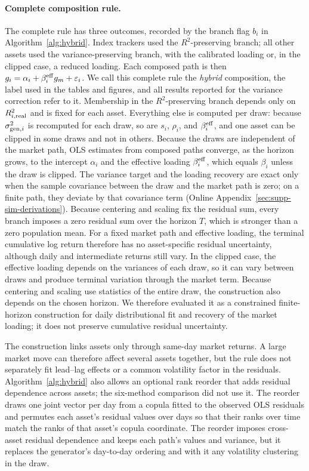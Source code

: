 \paragraph{Complete composition rule.}

The complete rule has three outcomes, recorded by the branch flag
$b_i$ in Algorithm~\ref{alg:hybrid}. Index trackers used the
$R^2$-preserving branch; all other assets used the
variance-preserving branch, with the calibrated loading or, in the
clipped case, a reduced loading. Each composed path is then
$g_i=\alpha_i+\beta_i^{\mathrm{eff}}g_m+\varepsilon_i$. We call this complete rule
the \emph{hybrid} composition, the label used in the tables and
figures, and all results reported for the variance correction refer
to it. Membership in the $R^2$-preserving branch depends only on
$R^2_{i,\mathrm{real}}$ and is fixed for each asset. Everything else is
computed per draw: because $\sigma_{\mathrm{gen},i}^2$ is recomputed for each
draw, so are $s_i$, $\rho_i$, and $\beta_i^{\mathrm{eff}}$, and one asset can be
clipped in some draws and not in others. Because the draws are independent of the market path, OLS estimates
from composed paths converge, as the horizon grows, to the intercept
$\alpha_i$ and the effective loading $\beta_i^{\mathrm{eff}}$, which equals
$\beta_i$ unless the draw is clipped. The variance target and the loading recovery are exact only when the
sample covariance between the draw and the market path is zero; on a
finite path, they deviate by that covariance term (Online
Appendix~\ref{sec:supp-sim-derivations}). Because centering and
scaling fix the residual sum, every branch imposes a zero residual sum over the horizon $T$, which is stronger than a zero population
mean. For a fixed market path and effective loading, the terminal
cumulative log return therefore has no asset-specific residual
uncertainty, although daily and intermediate returns still vary. In
the clipped case, the effective loading depends on the variances of
each draw, so it can vary between draws and produce terminal
variation through the market term. Because centering and scaling use
statistics of the entire draw, the construction also depends on the
chosen horizon. We therefore evaluated it as a constrained
finite-horizon construction for daily distributional fit and recovery
of the market loading; it does not preserve cumulative residual uncertainty.

The construction links assets only through same-day market returns.
A large market move can therefore affect several assets together, but
the rule does not separately fit lead--lag effects or a common
volatility factor in the residuals. Algorithm~\ref{alg:hybrid} also
allows an optional rank reorder that adds residual dependence across
assets; the six-method comparison did not use it. The reorder draws
one joint vector per day from a copula fitted to the observed OLS
residuals and permutes each asset's residual values over days so that
their ranks over time match the ranks of that asset's copula
coordinate. The reorder imposes cross-asset residual
dependence and keeps each path's values and variance, but it replaces the generator's day-to-day ordering and with it any
volatility clustering in the draw.

